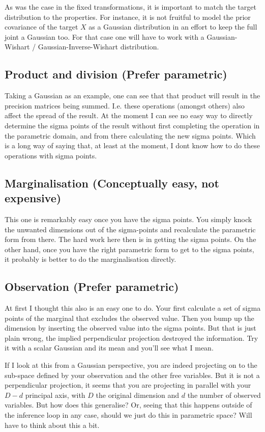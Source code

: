 As was the case in the fixed transformations, it is important to match
the target distribution to the properties. For instance, it is not
fruitful to model the prior covariance of the target $X$ as a Gaussian
distribution in an effort to keep the full joint a Gaussian too. For
that case one will have to work with a Gaussian-Wishart / Gaussian-Inverse-Wishart
distribution.


\subsection{Product and division (Prefer parametric)}

Taking a Gaussian as an example, one can see that that product will
result in the precision matrices being summed. I.e. these operations
(amongst others) also affect the spread of the result. At the moment
I can see no easy way to directly determine the sigma points of the
result without first completing the operation in the parametric domain,
and from there calculating the new sigma points. Which is a long way
of saying that, at least at the moment, I dont know how to do these
operations with sigma points.


\subsection{Marginalisation (Conceptually easy, not expensive)}

This one is remarkably easy once you have the sigma points. You simply
knock the unwanted dimensions out of the sigma-points and recalculate
the parametric form from there. The hard work here then is in getting
the sigma points. On the other hand, once you have the right parametric
form to get to the sigma points, it probably is better to do the marginalisation
directly.


\subsection{Observation (Prefer parametric)}

At first I thought this also is an easy one to do. Your first calculate
a set of sigma points of the marginal that excludes the observed value.
Then you bump up the dimension by inserting the observed value into
the sigma points. But that is just plain wrong, the implied perpendicular
projection destroyed the information. Try it with a scalar Gaussian
and its mean and you'll see what I mean.

If I look at this from a Gaussian perspective, you are indeed projecting
on to the sub-space defined by your observation and the other free
variables. But it is not a perpendicular projection, it seems that
you are projecting in parallel with your $D-d$ principal axis, with
$D$ the original dimension and $d$ the number of observed variables.
But how does this generalise? Or, seeing that this happens outside
of the inference loop in any case, should we just do this in parametric
space? Will have to think about this a bit.


